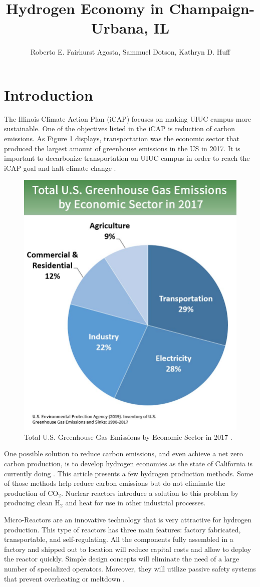\documentclass{anstrans}
\title{Hydrogen Economy in Champaign-Urbana, IL}
\author{Roberto E. Fairhurst Agosta, Sammuel Dotson, Kathryn D. Huff}
\institute{
University of Illinois at Urbana-Champaign, Dept. of Nuclear, Plasma, and Radiological Engineering\\
ref3@illinois.edu
}
\begin{document}
\section{Introduction}

The Illinois Climate Action Plan (iCAP) focuses on making UIUC campus more sustainable. One of the objectives listed in the iCAP is reduction of carbon emissions. As Figure \ref{fig:ghg} displays, transportation was the economic sector that produced the largest amount of greenhouse emissions in the US in 2017. It is important to decarbonize transportation on UIUC campus in order to reach the iCAP goal and halt climate change \cite{noauthor_illlinois_2015}.

\begin{figure}[H]
	\centering
	\includegraphics[width=0.6\linewidth]{figures/total-ghg-2019-caption.jpg}
	\hfill
	\caption{Total U.S. Greenhouse Gas Emissions by Economic Sector in 2017 \cite{us_epa_sources_2020}.}
	\label{fig:ghg}
\end{figure}

One possible solution to reduce carbon emissions, and even achieve a net zero carbon production, is to develop hydrogen economies as the state of California is currently doing \cite{brown_economic_2013}. This article presents a few hydrogen production methods. Some of those methods help reduce carbon emissions but do not eliminate the production of CO$_2$. Nuclear reactors introduce a solution to this problem by producing clean H$_2$ and heat for use in other industrial processes.

Micro-Reactors are an innovative technology that is very attractive for hydrogen production. This type of reactors has three main features: factory fabricated, transportable, and self-regulating. All the components fully assembled in a factory and shipped out to location will reduce capital costs and allow to deploy the reactor quickly. Simple design concepts will eliminate the need of a large number of specialized operators. Moreover, they will utilize passive safety systems that prevent overheating or meltdown \cite{noauthor_ultimate_2019}.
\end{document}
